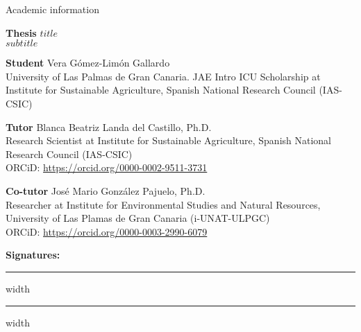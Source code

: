 \begin{flushleft}
  \Large
    Academic information
        
  \vspace{0.5cm}
  \normalsize
  \textbf{Thesis}
    $title$\\
    $subtitle$
  
  \vspace{0.5cm}
  \textbf{Student}
    Vera Gómez-Limón Gallardo\\
    University of Las Palmas de Gran Canaria. JAE Intro ICU Scholarship at Institute for Sustainable Agriculture, Spanish National Research Council (IAS-CSIC)
  
  \vspace{0.5cm}
  \textbf{Tutor}
    Blanca Beatriz Landa del Castillo, Ph.D.\\
    Research Scientist at Institute for Sustainable Agriculture, Spanish National Research Council (IAS-CSIC)\\
    ORCiD: \url{https://orcid.org/0000-0002-9511-3731}
  
  \vspace{0.5cm}
  \textbf{Co-tutor}
    José Mario González Pajuelo, Ph.D.\\
    Researcher at Institute for Environmental Studies and Natural Resources, University of Las Plamas de Gran Canaria (i-UNAT-ULPGC)\\
    ORCiD: \url{https://orcid.org/0000-0003-2990-6079}
  
  \vspace{1.0cm}
  \centerline{\textbf{Signatures:}}
  
  \vspace{0.5cm}
  \hrule height 0.4pt width \textwidth
  \vfill
  \hrule height 0.4pt width \textwidth
\end{flushleft}